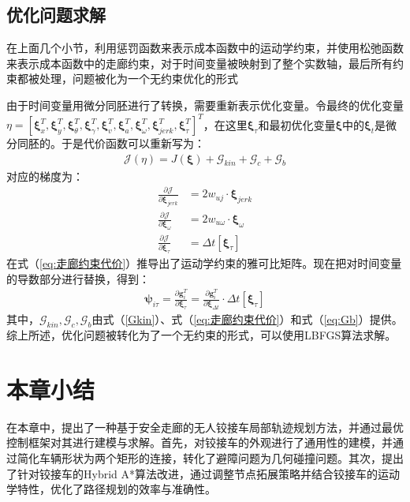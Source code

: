 \documentclass[master,academic]{ysuthesis} %
\begin{document}
		\subsection{优化问题求解}
		在上面几个小节，利用惩罚函数来表示成本函数中的运动学约束，并使用松弛函数来表示成本函数中的走廊约束，对于时间变量被映射到了整个实数轴，最后所有约束都被处理，问题被化为一个无约束优化的形式

		由于时间变量用微分同胚进行了转换，需要重新表示优化变量。令最终的优化变量$\eta =\left[ \bm{\xi} _{x}^{T},\bm{\xi} _{y}^{T},\bm{\xi} _{\theta}^{T},\bm{\xi} _{\gamma}^{T},\bm{\xi} _{v}^{T},\bm{\xi} _{a}^{T},\bm{\xi} _{\omega}^{T},\bm{\xi} _{jerk}^{T},\bm{\xi} _{\tau}^{T} \right] ^T$，在这里$\bm{\xi} _{\tau}$和最初优化变量$\bm{\xi}$中的$\bm{\xi} _{t}$是微分同胚的。于是代价函数可以重新写为：
		\begin{equation}
			\begin{aligned}
				\mathcal{J}\left( \eta \right) =J\left( \bm{\xi} \right) +\mathcal{G}_{kin}+\mathcal{G}_c+\mathcal{G}_b
			\end{aligned}
		\end{equation}
		对应的梯度为：
		\begin{equation}
			\begin{aligned}
				\frac{\partial \mathcal{J}}{\partial \bm{\xi} _{jerk}}&=2w_{uj}\cdot \bm{\xi} _{jerk}\\
				\frac{\partial \mathcal{J}}{\partial \bm{\xi} _{\omega}}&=2w_{u\omega}\cdot \bm{\xi} _{\omega}\\
				\frac{\partial \mathcal{J}}{\partial \bm{\xi} _{\tau}}&=\Delta t\left[ \bm{\xi} _{\tau} \right]
			\end{aligned}
		\end{equation}
		在式（\ref{eq:走廊约束代价}）推导出了运动学约束的雅可比矩阵。现在把对时间变量的导数部分进行替换，得到：
		\begin{equation}
			\begin{aligned}
				\bm{\psi} _{i\tau}=\frac{\partial \bm{g}_{i}^{T}}{\partial \bm{\xi} _{\tau}}=\frac{\partial \bm{g}_{i}^{T}}{\partial \bm{\xi} _{\Delta t}}\cdot \Delta t\left[ \bm{\xi} _{\tau} \right] 
			\end{aligned}
		\end{equation}
		其中，$\mathcal{G}_{kin},\mathcal{G}_c,\mathcal{G}_b$由式（\ref{Gkin}）、式（\ref{eq:走廊约束代价}）和式（\ref{eq:Gb}）提供。
		综上所述，优化问题被转化为了一个无约束的形式，可以使用LBFGS算法求解。

	\section{本章小结}
	在本章中，提出了一种基于安全走廊的无人铰接车局部轨迹规划方法，并通过最优控制框架对其进行建模与求解。首先，对铰接车的外观进行了通用性的建模，并通过简化车辆形状为两个矩形的连接，转化了避障问题为几何碰撞问题。其次，提出了针对铰接车的Hybrid A*算法改进，通过调整节点拓展策略并结合铰接车的运动学特性，优化了路径规划的效率与准确性。
\end{document}
